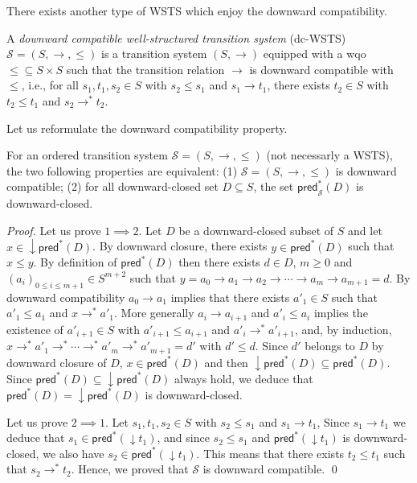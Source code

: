 \documentclass[runningheads]{llncs}
\newcommand{\pred}{\textsf{pred}}
\begin{document}
There exists another type of WSTS which enjoy the downward compatibility.

\begin{definition}\cite{DBLP:journals/iandc/Finkel90,DBLP:journals/tcs/FinkelS01}
A {\em downward compatible well-structured transition system} (dc-WSTS)  $\mathscr{S}=(S, \rightarrow, \leq)$
is a transition system $(S, \rightarrow)$
equipped with a wqo ${\leq} \subseteq S \times S$ such that   
the transition relation $ \rightarrow$ is downward compatible with $\leq$, i.e., for all 
$s_1, t_1 , s_2 \in S$
	with $s_2 \leq s_1$  and $s_1 \rightarrow t_1$, there exists 
	$t_2 \in S$ with 
	$t_2 \leq t_1$ and $s_2 \rightarrow^{*} t_2$.
\end{definition}

Let us reformulate the downward compatibility property.

\begin{lemma}\label{downward compatible}
For an ordered transition system $\mathscr{S}=(S, \rightarrow, \leq)$ (not necessarly a WSTS), the two following properties are equivalent: (1) $\mathscr{S}=(S, \rightarrow, \leq)$ is downward compatible; (2) for all downward-closed set $D \subseteq S$, the set $\pred_{\mathscr{S}}^*(D)$ is downward-closed.
\end{lemma}

\begin{proof}
Let us prove $1 \implies 2$. 
Let $D$ be a downward-closed subset of $S$
and let $x \in \downarrow \pred^*(D)$.
By downward closure, there exists
$y \in \pred^*(D)$ 
such that $x \leq y$.
By definition of $\pred^*(D)$ then there exists 
$d \in D$, $m\geq 0$ and $(a_i)_{0 \leq i \leq m+1} \in S^{m+2}$ such that
$y = a_0 \to a_1 \to a_2 \to \cdots \to a_m \to a_{m+1} = d$.
%
By downward compatibility $a_0 \to a_1$
implies that there exists $a'_1 \in S$ such that $a'_1 \leq a_1$ and
$x \to^* a'_1$.
More generally $a_i \to a_{i+1}$ and
$a'_i\leq a_i$ implies the existence of $a'_{i+1} \in S$ with $a'_{i+1} \leq a_{i+1}$ and
$a'_i \to^* a'_{i+1}$,
and, by induction,
 $x \to^* a'_1 \to^* \cdots \to^* a'_{m} \to^* a'_{m+1} = d'$
with $d' \leq d$.
Since
$d'$ 
belongs to $D$ by downward closure of $D$, $x \in \pred^*(D)$ and then $\downarrow\pred^*(D) \subseteq \pred^*(D)$. Since $\pred^*(D) \subseteq \downarrow \pred^*(D)$ always hold, we deduce that $\pred^*(D)=\downarrow\pred^*(D)$ is downward-closed.

Let us prove $2 \implies 1$. Let $s_1, t_1 , s_2 \in S$ with $s_2 \leq s_1$  and $s_1 \rightarrow t_1$, Since $s_1 \rightarrow t_1$ we deduce that $s_1 \in \pred^*(\downarrow t_1)$, and since $s_2 \leq s_1$ and $\pred^*(\downarrow t_1)$ is downward-closed, we also have $s_2 \in \pred^*(\downarrow t_1)$. This means that there exists $t_2 \leq t_1$ such that 
$s_2 \rightarrow^{*} t_2$. Hence, we proved that $\mathscr{S}$ is downward compatible.
\qed
\end{proof}
\end{document}
